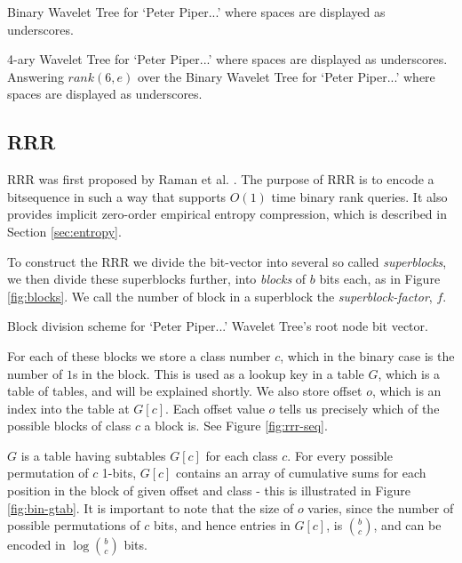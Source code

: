 			{Binary Wavelet Tree for `Peter Piper...' where spaces are displayed
			as underscores.}
			
			{4-ary Wavelet Tree for `Peter Piper...' where spaces are 
			displayed as underscores.}
\clearpage
			{Answering $rank(6, e)$ over the Binary Wavelet Tree for `Peter
			Piper...' where spaces are displayed as underscores.}












\subsection{RRR}
RRR was first proposed by Raman et al. \cite{rrr2007}. The purpose of RRR is to
encode a bitsequence in such a way that supports $O(1)$ time binary rank 
queries. It also provides implicit zero-order empirical entropy compression, 
which is described in Section \ref{sec:entropy}.

To construct the RRR we divide the bit-vector into several so called 
\emph{superblocks}, we then divide these superblocks further, into 
\emph{blocks} of $b$ bits each, as in Figure \ref{fig:blocks}. We call the 
number of block in a superblock the \emph{superblock-factor}, $f$.

			{Block division scheme for `Peter Piper...' Wavelet Tree's root
			node bit vector.}

For each of these blocks we store a class number $c$, which in the binary case 
is the number of  $1$s in the block. This is used as a lookup key in a table 
$G$, which is a table of tables, and will be explained shortly. We also store 
offset $o$, which is an index into the table at $G[c]$. Each offset value $o$ 
tells us precisely which of the possible blocks of class $c$ a block is. See 
Figure \ref{fig:rrr-seq}.

$G$ is a table having subtables $G[c]$ for each class $c$. For every possible 
permutation of $c$ 1-bits, $G[c]$ contains an array of cumulative sums for each 
position in the block of given offset and class - this is illustrated in Figure \ref{fig:bin-gtab}. It is important to note that 
the size of $o$ varies, since the number of possible permutations of $c$ bits, 
and hence entries in $G[c]$, is $b \choose c$, and can be encoded in $\log {b 
\choose c}$ bits.

